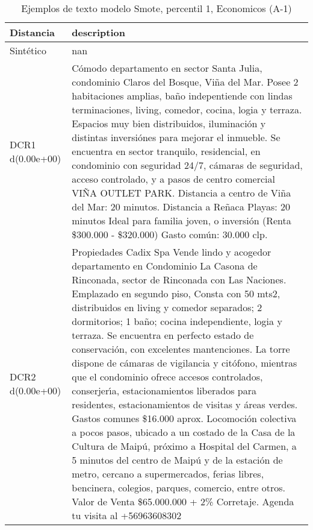 \begin{table}[H]
\centering
\fontsize{10}{14}\selectfont
\caption{Ejemplos de texto modelo Smote, percentil 1, Economicos (A-1)}
\label{table-example-economicos-a-1-smote-enc-1p-text}
\begin{tabular}{|l|m{35em}|}
\hline
\rowcolor[gray]{0.8}
Distancia & description \\
\hline Sintético & nan \\
\hline DCR1 d(0.00e+00) & C\'omodo departamento en sector Santa Julia, condominio Claros del Bosque, Vi\~na del Mar. Posee 2 habitaciones amplias, ba\~no indepentiende con lindas terminaciones, living, comedor, cocina, logia y terraza. Espacios muy bien distribuidos, iluminaci\'on y distintas inversi\'ones para mejorar el inmueble. Se encuentra en sector tranquilo, residencial, en condominio con seguridad 24/7, c\'amaras de seguridad, acceso controlado, y a pasos de centro comercial VI\~NA OUTLET PARK. Distancia a centro de Vi\~na del Mar: 20 minutos. Distancia a Re\~naca Playas: 20 minutos Ideal para familia joven, o inversi\'on (Renta \$300.000 - \$320.000) Gasto com\'un: 30.000 clp. \\
\hline DCR2 d(0.00e+00) & Propiedades Cadix Spa Vende lindo y acogedor departamento en Condominio La Casona de Rinconada, sector de Rinconada con Las Naciones. Emplazado en segundo piso, Consta con 50 mts2, distribuidos en living y comedor separados; 2 dormitorios; 1 ba\~no; cocina independiente, logia y terraza. Se encuentra en perfecto estado de conservaci\'on, con excelentes mantenciones. La torre dispone de c\'amaras de vigilancia y cit\'ofono, mientras que el condominio ofrece accesos controlados, conserjer{\'\i}a, estacionamientos liberados para residentes, estacionamientos de visitas y \'areas verdes. Gastos comunes \$16.000 aprox. 
Locomoci\'on colectiva a pocos pasos, ubicado a un costado de la Casa de la Cultura de Maip\'u, pr\'oximo a Hospital del Carmen, a 5 minutos del centro de Maip\'u y de la estaci\'on de metro, cercano a supermercados, ferias libres, bencinera, colegios, parques, comercio, entre otros.
Valor de Venta \$65.000.000 + 2\% Corretaje. Agenda tu visita al +56963608302 \\
\hline
\end{tabular}
\end{table}
